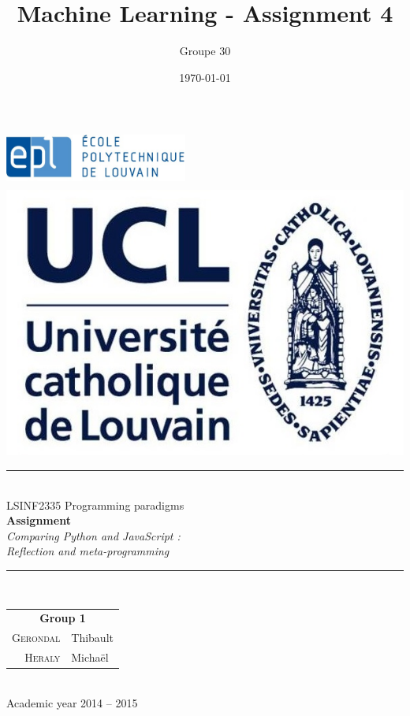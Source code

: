 \documentclass[a4paper,10pt]{article}
\author{Groupe 30}
\title{Machine Learning - Assignment 4}
\date{\today}
\begin{document}
   
\begin{titlepage}
\newcommand{\HRule}{\rule{\linewidth}{0.5mm}} 
\includegraphics[width=6cm,height=1.9cm]{images/Logo_EPL.jpg}
\hfill 
\includegraphics[width=3.3 cm,height=2.2 cm]{images/ucl.jpg}

\centering %
 
\null
\vspace{4 cm}


\HRule \\[0.9cm]

{ {\LARGE LSINF2335 Programming paradigms}\\[0.4cm]

\huge \textbf{Assignment} \\[0.6 cm]
{\LARGE \textit{Comparing Python and JavaScript : \\Reflection and meta-programming } }}
\\[0.9cm]
\HRule \\[3cm]
 
\Large {

\begin{tabular}{rl} 

\multicolumn{2}{c}{\textbf{Group 1}}  \\[0.3 cm]
\textsc{Gerondal} & Thibault  \\
\textsc{Heraly } & Michaël \\



\end{tabular}}
\\[2cm]



\large{Academic year 2014 -- 2015} %

\end{titlepage}
\end{document}
